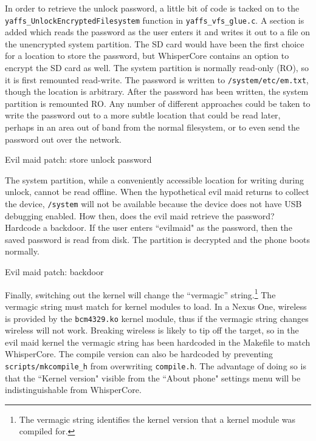 In order to retrieve the unlock password, a little bit of code is tacked on to the \texttt{yaffs\_UnlockEncryptedFilesystem}
function in \texttt{yaffs\_vfs\_glue.c}. A section is added which reads the password as the user enters it and writes it out to a
file on the unencrypted system partition.  The SD card would have been the first choice for a location to store the password, but
WhisperCore contains an option to encrypt the SD card as well. The system partition is normally read-only (RO), so it is first
remounted read-write. The password is written to \texttt{/system/etc/em.txt}, though the location is arbitrary. After the password
has been written, the system partition is remounted RO. Any number of different approaches could be taken to write the password out
to a more subtle location that could be read later, perhaps in an area out of band from the normal filesystem, or to even send the
password out over the network. 

\begin{table}[htpb]

\label{tab:storepass}
\caption{Evil maid patch: store unlock password}
\end{table}

The system partition, while a conveniently accessible location for writing during unlock, cannot be read offline.  When the
hypothetical evil maid returns to collect the device, \texttt{/system} will not be available because the device does not have USB
debugging enabled.  How then, does the evil maid retrieve the password? Hardcode a backdoor.  If the user enters ``evilmaid" as the
password, then the saved password is read from disk.  The partition is decrypted and the phone boots normally. 

\begin{table}[htpb]

\label{tab:backdoor}
\caption{Evil maid patch: backdoor}
\end{table}

Finally, switching out the kernel will change the ``vermagic'' string.\footnote{The vermagic string identifies the kernel version
that a kernel module was compiled for.} The vermagic string must match for kernel modules to load.  In a Nexus One, wireless is
provided by the \texttt{bcm4329.ko} kernel module, thus if the vermagic string changes wireless will not work.  Breaking wireless is likely
to tip off the target, so in the evil maid kernel the vermagic string has been hardcoded in the Makefile to match WhisperCore. 
The compile version can also be hardcoded by preventing \texttt{scripts/mkcompile\_h} from overwriting \texttt{compile.h}. 
The advantage of doing so is that the ``Kernel version" visible from the ``About phone" settings menu will be indistinguishable from WhisperCore.

